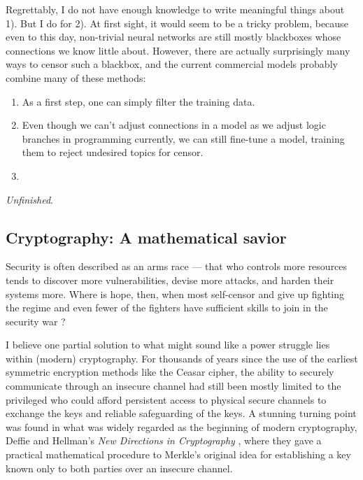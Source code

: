 \documentclass[10pt]{article}
\begin{document}
Regrettably, I do not have enough knowledge to write meaningful things
about 1). But I do for 2). At first sight, it would seem to be a tricky
problem, because even to this day, non-trivial neural networks are still mostly
blackboxes whose connections we know little about. However, there are actually
surprisingly many ways to censor such a blackbox, and the current commercial
models probably combine many of these methods:
\begin{enumerate}
\item As a first step, one can simply filter the training data. 
\item Even though we can't adjust connections in a model as we adjust
	logic branches in programming currently, we can still fine-tune a model,
training them to reject undesired topics for censor.  
\item 
\end{enumerate}

\emph{Unfinished}.

\subsection[Cryptography]{Cryptography: A mathematical
savior\protect\footnotemark}
\label{sec.crypto}
Security is often described as an arms race --- that who controls more
resources tends to discover more vulnerabilities, devise more attacks, and
harden their systems more. Where is hope, then, when most self-censor and give
up fighting the regime \cite{self.censor.1, self.censor.2, self.censor.3}  and
even fewer of the fighters have sufficient skills to join in the security war
\cite{defenders.lack.skills.1, defenders.lack.skills.2}?

I believe one partial solution to what might sound like a power struggle lies
within (modern) cryptography. For thousands of years since the use of the
earliest symmetric encryption methods like the Ceasar cipher, the ability to
securely communicate through an insecure channel had still been mostly limited
to the privileged who could afford persistent access to physical secure
channels to exchange the keys and reliable safeguarding of the keys.  A
stunning turning point was found in what was widely regarded as the beginning
of modern cryptography, Deffie and Hellman's \emph{New Directions in
Cryptography} \cite{new.directions.crypto}, where they gave a practical
mathematical procedure to Merkle's original idea for establishing a key known
only to both parties over an insecure channel.
\end{document}
